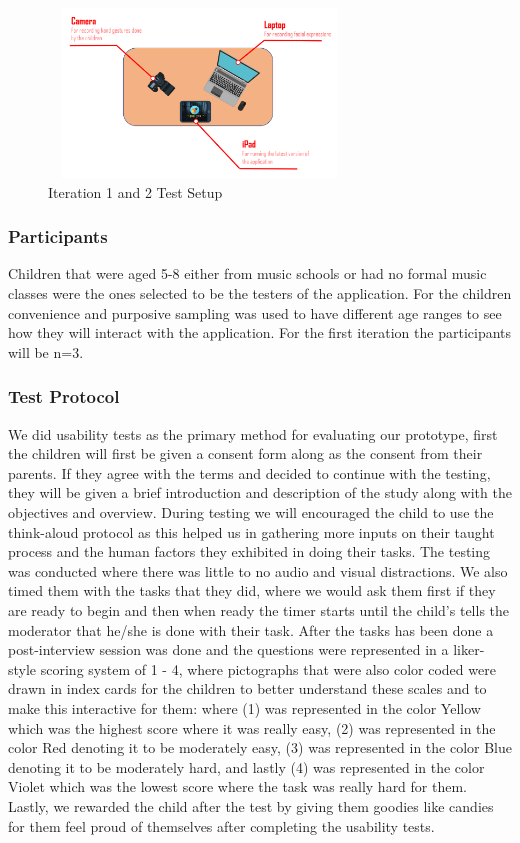  \begin{figure}[H]
    \centering
    \includegraphics[width=8cm,height=4.5cm]{NewFigures/Test_Setup.png}
    \caption{Iteration 1 and 2 Test Setup}
    \label{fig:test_setup}
\end{figure}

\subsubsection{Participants}
Children that were aged 5-8 either from music schools or had no formal music classes were the ones selected to be the testers of the application. For the children convenience and purposive sampling was used to have different age ranges to see how they will interact with the application. For the first iteration the participants will be n=3.

\subsubsection{Test Protocol}
We did usability tests as the primary method for evaluating our prototype, first the children will first be given a consent form along as the consent from their parents. If they agree with the terms and decided to continue with the testing, they will be given a brief introduction and description of the study along with the objectives and overview. During testing we will encouraged the child to use the think-aloud protocol as this helped us in gathering more inputs on their taught process and the human factors they exhibited in doing their tasks. The testing was conducted where there was little to no audio and visual distractions. We also timed them with the tasks that they did, where we would ask them first if they are ready to begin and then when ready the timer starts until the child's tells the moderator that he/she is done with their task. After the tasks has been done a post-interview session was done and the questions were represented in a liker-style scoring system of 1 - 4, where pictographs that were also color coded were drawn in index cards for the children to better understand these scales and to make this interactive for them: where (1) was represented in the color Yellow which was the highest score where it was really easy, (2) was represented in the color Red denoting it to be moderately easy, (3) was represented in the color Blue denoting it to be moderately hard, and lastly (4) was represented in the color Violet which was the lowest score where the task was really hard for them. Lastly, we rewarded the child after the test by giving them goodies like candies for them feel proud of themselves after completing the usability tests.



